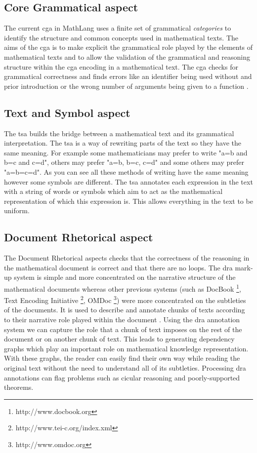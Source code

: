 \subsection{Core Grammatical aspect \label{subsec:cga}}
The current \gls{cga} in MathLang uses a finite set of grammatical \textit{categories} to identify the structure and common concepts used in mathematical texts. The aims of the \gls{cga} is to make explicit the grammatical role played by the elements of mathematical texts and to allow the validation of the grammatical and reasoning structure within the \gls{cga} encoding in a mathematical text. The \gls{cga} checks for grammatical correctness and finds errors like an identifier being used without and prior introduction or the wrong number of arguments being given to a function \cite{krzysztofphd}.

\subsection{Text and Symbol aspect \label{subsec:tsa}}
The \gls{tsa} builds the bridge between a mathematical text and its grammatical interpretation. The \gls{tsa} is a way of rewriting parts of the text so they have the same meaning. For example some mathematicians may prefer to write "a=b and b=c and c=d", others may prefer "a=b, b=c, c=d" and some others may prefer "a=b=c=d". As you can see all these methods of writing have the same meaning however some symbols are different. The \gls{tsa} annotates each expression in the text with a string of words or symbols which aim to act as the mathematical representation of which this expression is. This allows everything in the text to be uniform.

\subsection{Document Rhetorical aspect \label{subsec:dra}}

The Document Rhetorical aspects checks that the correctness of the reasoning in the mathematical document is correct and that there are no loops. The \gls{dra} mark-up system is simple and more concentrated on the narrative structure of the mathematical documents whereas other previous systems (such as DocBook \footnote{http://www.docbook.org}, Text Encoding Initiative \footnote{http://www.tei-c.org/index.xml}, OMDoc \footnote{http://www.omdoc.org}) were more concentrated on  the subtleties of the documents. It is used to describe and annotate chunks of texts according to their narrative role played within the document \cite{krzysztofphd}. Using the \gls{dra} annotation system we can capture the role that a chunk of text imposes on the rest of the document or on another chunk of text. This leads to generating dependency graphs which play an important role on mathematical knowledge representation. With these graphs, the reader can easily find their own way while reading the original text without the need to understand all of its subtleties. Processing \gls{dra} annotations can flag problems such as cicular reasoning and poorly-supported theorems.

